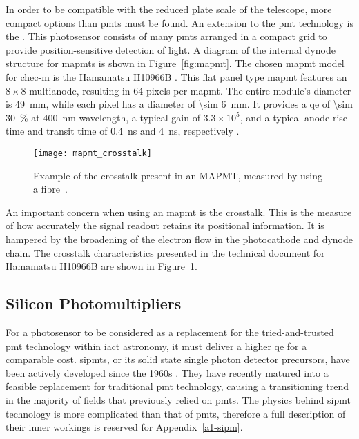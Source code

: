 In order to be compatible with the reduced plate scale of the telescope, more compact options than \glspl{pmt} must be found. An extension to the \gls{pmt} technology is the . This photosensor consists of many \glspl{pmt} arranged in a compact grid to provide position-sensitive detection of light. A diagram of the internal dynode structure for \glspl{mapmt} is shown in Figure~\ref{fig:mapmt}. The chosen \gls{mapmt} model for \gls{chec-m} is the Hamamatsu H10966B . This flat panel type \gls{mapmt} features an $8 \times 8$ multianode, resulting in 64 pixels per \gls{mapmt}. The entire module's diameter is \SI{49}{mm}, while each pixel has a diameter of \SI{\sim 6}{mm}. It provides a \gls{qe} of \SI{\sim 30}{\percent} at \SI{400}{nm} wavelength, a typical gain of $3.3 \times 10^5$, and a typical anode rise time and transit time of \SI{0.4}{ns} and \SI{4}{ns}, respectively \cite{Hamamatsu2011}. 

\begin{figure}
	\centering
    \texttt{[image: mapmt\_crosstalk]} 
	\caption[Multi-anode Photomultiplier Tube crosstalk.]{Example of the crosstalk present in an MAPMT, measured by using a fibre~\cite{Hamamatsu2011}.}
	\label{fig:mapmt_crosstalk}
\end{figure}

An important concern when using an \gls{mapmt} is the crosstalk. This is the measure of how accurately the signal readout retains its positional information. It is hampered by the broadening of the electron flow in the photocathode and dynode chain. The crosstalk characteristics presented in the technical document for Hamamatsu H10966B are shown in Figure~\ref{fig:mapmt_crosstalk}.

\subsection{Silicon Photomultipliers}

For a photosensor to be considered as a replacement for the tried-and-trusted \gls{pmt} technology within \gls{iact} astronomy, it must deliver a higher \gls{qe} for a comparable cost. \glspl{sipmt}, or its solid state single photon detector precursors, have been actively developed since the 1960s \cite{Renker2006}. They have recently matured into a feasible replacement for traditional \gls{pmt} technology, causing a transitioning trend in the majority of fields that previously relied on \glspl{pmt}. The physics behind \gls{sipmt} technology is more complicated than that of \glspl{pmt}, therefore a full description of their inner workings is reserved for Appendix~\ref{a1-sipm}.

